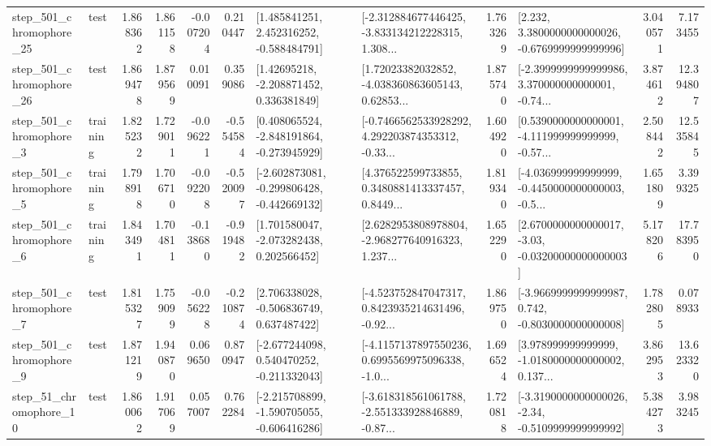 \begin{tabular}{llrrrrllrlrr}
  step\_501\_chromophore\_25 &      test &      1.868362 &    1.861158 &     -0.007204 &  0.210447 &    [1.485841251, 2.452316252, -0.588484791] &  [-2.312884677446425, -3.833134212228315, 1.308... &       1.763269 &   [2.232, 3.3800000000000026, -0.6769999999999996] &            3.040571 &          7.173455 \\
  step\_501\_chromophore\_26 &      test &      1.869478 &    1.879569 &      0.010091 &  0.359086 &     [1.42695218, -2.208871452, 0.336381849] &  [1.72023382032852, -4.038360863605143, 0.62853... &       1.875740 &  [-2.3999999999999986, 3.370000000000001, -0.74... &            3.874612 &         12.394807 \\
   step\_501\_chromophore\_3 &  training &      1.825232 &    1.729011 &     -0.096221 & -0.554584 &   [0.408065524, -2.848191864, -0.273945929] &  [-0.7466562533928292, 4.292203874353312, -0.33... &       1.604920 &  [0.5390000000000001, -4.111999999999999, -0.57... &            2.508442 &         12.535845 \\
   step\_501\_chromophore\_5 &  training &      1.798918 &    1.706710 &     -0.092208 & -0.520097 &  [-2.602873081, -0.299806428, -0.442669132] &  [4.376522599733855, 0.3480881413337457, 0.8449... &       1.819340 &  [-4.036999999999999, -0.4450000000000003, -0.5... &            1.651809 &          3.399325 \\
   step\_501\_chromophore\_6 &  training &      1.843491 &    1.704811 &     -0.138680 & -0.919482 &    [1.701580047, -2.073282438, 0.202566452] &  [2.6282953808978804, -2.968277640916323, 1.237... &       1.652290 &  [2.6700000000000017, -3.03, -0.03200000000000003] &            5.178206 &         17.783950 \\
   step\_501\_chromophore\_7 &      test &      1.815327 &    1.759099 &     -0.056228 & -0.210874 &    [2.706338028, -0.506836749, 0.637487422] &  [-4.523752847047317, 0.8423935214631496, -0.92... &       1.869750 &  [-3.9669999999999987, 0.742, -0.8030000000000008] &            1.782805 &          0.078933 \\
   step\_501\_chromophore\_9 &      test &      1.871219 &    1.940870 &      0.069650 &  0.870947 &   [-2.677244098, 0.540470252, -0.211332043] &  [-4.1157137897550236, 0.6995569975096338, -1.0... &       1.696524 &  [3.978999999999999, -1.0180000000000002, 0.137... &            3.862953 &         13.623320 \\
   step\_51\_chromophore\_10 &      test &      1.860062 &    1.917069 &      0.057007 &  0.762284 &  [-2.215708899, -1.590705055, -0.606416286] &  [-3.618318561061788, -2.551333928846889, -0.87... &       1.720818 &  [-3.3190000000000026, -2.34, -0.5109999999999992] &            5.384273 &          3.983245 \\

\end{tabular}
